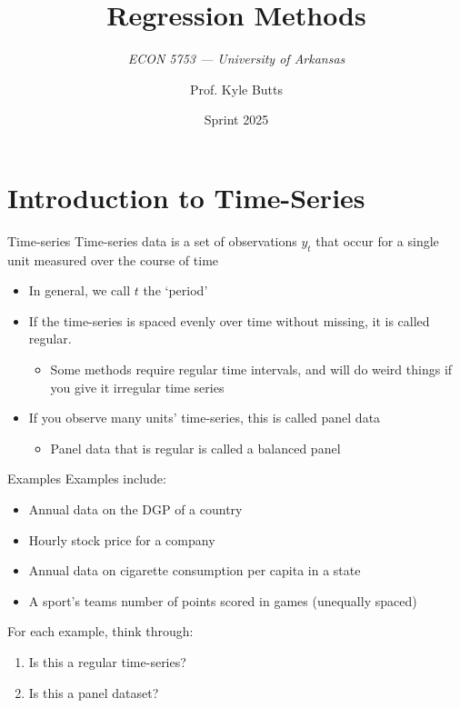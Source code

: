 \documentclass[aspectratio=169,t,11pt,table]{beamer}
\title{Regression Methods}
\subtitle{\it  ECON 5753 — University of Arkansas}
\date{Sprint 2025}
\author{Prof. Kyle Butts}
\begin{document}
\begin{frame}
\maketitle
\end{frame}

\section{Introduction to Time-Series}

\begin{frame}{Time-series}
  \alert{Time-series} data is a set of observations $y_t$ that occur for a single unit measured over the course of time
  \begin{itemize}
    \item In general, we call $t$ the `period'
    
    \medskip
    \item If the time-series is spaced evenly over time without missing, it is called \alert{regular}. 
    \begin{itemize}
      \item Some methods require regular time intervals, and will do weird things if you give it irregular time series
    \end{itemize}
    
    \medskip
    \item If you observe many units' time-series, this is called \alert{panel data}
    \begin{itemize}
      \item Panel data that is regular is called a \alert{balanced panel}
    \end{itemize}
  \end{itemize}
\end{frame}

\begin{frame}{Examples}
  Examples include:
  \begin{itemize}
    \item Annual data on the DGP of a country
    \item Hourly stock price for a company
    \item Annual data on cigarette consumption per capita in a state 
    \item A sport's teams number of points scored in games (unequally spaced)
  \end{itemize}

  \bigskip
  For each example, think through:
  \begin{enumerate}
    \item Is this a regular time-series?
    
    \item Is this a panel dataset?
  \end{enumerate}
\end{frame}
\end{document}

